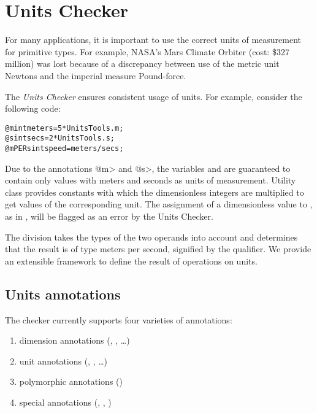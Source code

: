 \htmlhr
\chapter{Units Checker\label{units-checker}}

For many applications, it is important to use the correct units of measurement
for primitive types. For example, NASA's Mars Climate Orbiter (cost: \$327
million) was lost because of a discrepancy between use of the metric unit
Newtons and the imperial measure Pound-force.

The \emph{Units Checker} ensures consistent usage of units. For example,
consider the following code:

\begin{alltt}
@m int meters = 5 * UnitsTools.m;
@s int secs = 2 * UnitsTools.s;
@mPERs int speed = meters / secs;
\end{alltt}

Due to the annotations \<@m> and \<@s>, the variables  and
 are guaranteed to contain only values with meters and seconds as
units of measurement. Utility class  provides constants with
which the dimensionless integers are multiplied to get values of the
corresponding unit. The assignment of a dimensionless value to , as
in , will be flagged as an error by the Units Checker.

The division  takes the types of the two operands into account
and determines that the result is of type meters per second, signified by the
 qualifier. We provide an extensible framework to define the result
of operations on units.


\section{Units annotations\label{units-annotations}}

The checker currently supports four varieties of annotations:

\begin{enumerate}

\item dimension annotations
(,
, \dots)

\item unit annotations
(,
, \dots)

\item polymorphic annotations
()

\item special annotations
(,
,
)

\end{enumerate}

